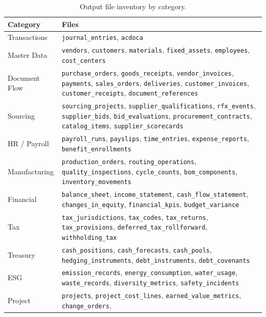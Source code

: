 \begin{table}[ht]
\centering
\caption{Output file inventory by category.}
\label{tab:output_inventory}
\footnotesize
\begin{tabular}{lp{9cm}}
\toprule
\textbf{Category} & \textbf{Files} \\
\midrule
Transactions &
  \texttt{journal\_entries}, \texttt{acdoca} \\
Master Data &
  \texttt{vendors}, \texttt{customers}, \texttt{materials},
  \texttt{fixed\_assets}, \texttt{employees}, \texttt{cost\_centers} \\
Document Flow &
  \texttt{purchase\_orders}, \texttt{goods\_receipts},
  \texttt{vendor\_invoices}, \texttt{payments}, \texttt{sales\_orders},
  \texttt{deliveries}, \texttt{customer\_invoices},
  \texttt{customer\_receipts}, \texttt{document\_references} \\
Sourcing &
  \texttt{sourcing\_projects}, \texttt{supplier\_qualifications},
  \texttt{rfx\_events}, \texttt{supplier\_bids},
  \texttt{bid\_evaluations}, \texttt{procurement\_contracts},
  \texttt{catalog\_items}, \texttt{supplier\_scorecards} \\
HR / Payroll &
  \texttt{payroll\_runs}, \texttt{payslips}, \texttt{time\_entries},
  \texttt{expense\_reports}, \texttt{benefit\_enrollments} \\
Manufacturing &
  \texttt{production\_orders}, \texttt{routing\_operations},
  \texttt{quality\_inspections}, \texttt{cycle\_counts},
  \texttt{bom\_components}, \texttt{inventory\_movements} \\
Financial &
  \texttt{balance\_sheet}, \texttt{income\_statement},
  \texttt{cash\_flow\_statement}, \texttt{changes\_in\_equity},
  \texttt{financial\_kpis}, \texttt{budget\_variance} \\
Tax &
  \texttt{tax\_jurisdictions}, \texttt{tax\_codes},
  \texttt{tax\_returns}, \texttt{tax\_provisions},
  \texttt{deferred\_tax\_rollforward}, \texttt{withholding\_tax} \\
Treasury &
  \texttt{cash\_positions}, \texttt{cash\_forecasts},
  \texttt{cash\_pools}, \texttt{hedging\_instruments},
  \texttt{debt\_instruments}, \texttt{debt\_covenants} \\
ESG &
  \texttt{emission\_records}, \texttt{energy\_consumption},
  \texttt{water\_usage}, \texttt{waste\_records},
  \texttt{diversity\_metrics}, \texttt{safety\_incidents} \\
Project &
  \texttt{projects}, \texttt{project\_cost\_lines},
  \texttt{earned\_value\_metrics}, \texttt{change\_orders},

\end{tabular}
\end{table}
